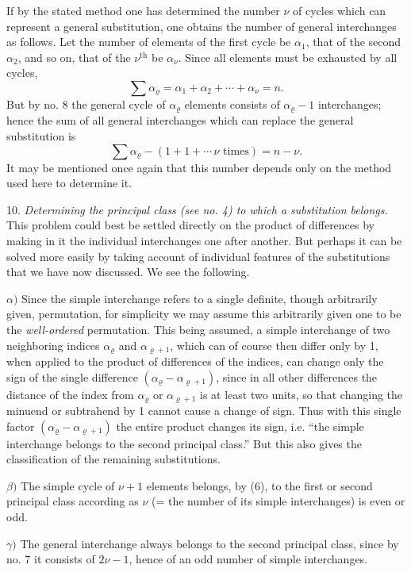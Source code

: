 \documentclass[10pt]{article}
\begin{document}
If by the stated method one has determined the number \(\nu\) of cycles which can represent a general substitution, one obtains the number of general interchanges as follows. Let the number of elements of the first cycle be \(\alpha_1\), that of the second \(\alpha_2\), and so on, that of the \(\nu^{\mathrm{th}}\) be \(\alpha_\nu\). Since all elements must be exhausted by all cycles,
\[
\sum\alpha_\varrho=\alpha_1+\alpha_2+\cdots+\alpha_\nu=n.
\]
But by no. 8 the general cycle of \(\alpha_\varrho\) elements consists of \(\alpha_\varrho-1\) interchanges; hence the sum of all general interchanges which can replace the general substitution is
\[
\sum\alpha_\varrho-(1+1+\cdots\,\nu\text{ times})=n-\nu.
\]
It may be mentioned once again that this number depends only on the method used here to determine it.

10. \emph{Determining the principal class (see no. 4) to which a substitution belongs.} This problem could best be settled directly on the product of differences by making in it the individual interchanges one after another. But perhaps it can be solved more easily by taking account of individual features of the substitutions that we have now discussed. We see the following.

\(\alpha)\) Since the simple interchange refers to a single definite, though arbitrarily given, permutation, for simplicity we may assume this arbitrarily given one to be the \emph{well-ordered} permutation. This being assumed, a simple interchange of two neighboring indices \(\alpha_\varrho\) and \(\alpha_{\varrho+1}\), which can of course then differ only by 1, when applied to the product of differences of the indices, can change only the sign of the single difference \((\alpha_\varrho-\alpha_{\varrho+1})\), since in all other differences the distance of the index from \(\alpha_\varrho\) or \(\alpha_{\varrho+1}\) is at least two units, so that changing the minuend or subtrahend by 1 cannot cause a change of sign. Thus with this single factor \((\alpha_\varrho-\alpha_{\varrho+1})\) the entire product changes its sign, i.e. ``the simple interchange belongs to the second principal class.'' But this also gives the classification of the remaining substitutions.

\(\beta)\) The simple cycle of \(\nu+1\) elements belongs, by (6), to the first or second principal class according as \(\nu\) (= the number of its simple interchanges) is even or odd.

\(\gamma)\) The general interchange always belongs to the second principal class, since by no. 7 it consists of \(2\nu-1\), hence of an odd number of simple interchanges.
\end{document}
